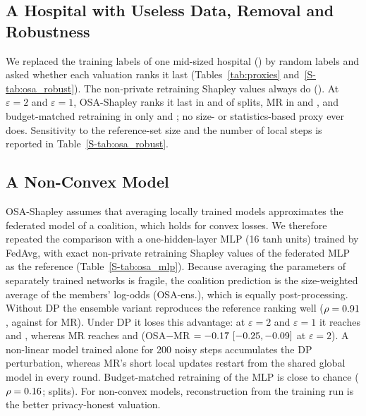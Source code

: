 \subsection{A Hospital with Useless Data, Removal and Robustness}
\label{sec:p19_robust}
We replaced the training labels of one mid-sized hospital (\corrHosp) by random labels and asked whether each valuation ranks it last (Tables~\ref{tab:proxies} and~\ref{S-tab:osa_robust}). The non-private retraining Shapley values always do (\corrTruth). At $\varepsilon=2$ and $\varepsilon=1$, OSA-Shapley ranks it last in \corrOsaTwo{} and \corrOsaOne{} of splits, MR in \corrMrTwo{} and \corrMrOne, and budget-matched retraining in only \corrBmTwo{} and \corrBmOne; no size- or statistics-based proxy ever does. Sensitivity to the reference-set size and the number of local steps is reported in Table~\ref{S-tab:osa_robust}.

\subsection{A Non-Convex Model}
\label{sec:p19_mlp}
OSA-Shapley assumes that averaging locally trained models approximates the federated model of a coalition, which holds for convex losses. We therefore repeated the comparison with a one-hidden-layer MLP (16 tanh units) trained by FedAvg, with exact non-private retraining Shapley values of the federated MLP as the reference (Table~\ref{S-tab:osa_mlp}). Because averaging the parameters of separately trained networks is fragile, the coalition prediction is the size-weighted average of the members' log-odds (OSA-ens.), which is equally post-processing. Without DP the ensemble variant reproduces the reference ranking well ($\rho=0.91$, against \mlpMrNoDP{} for MR). Under DP it loses this advantage: at $\varepsilon=2$ and $\varepsilon=1$ it reaches \mlpOsaTwo{} and \mlpOsaOne{}, whereas MR reaches \mlpMrTwo{} and \mlpMrOne{} (OSA$-$MR $=-0.17\ [-0.25, -0.09]$ at $\varepsilon=2$). A non-linear model trained alone for 200 noisy steps accumulates the DP perturbation, whereas MR's short local updates restart from the shared global model in every round. Budget-matched retraining of the MLP is close to chance ($\rho=0.16$; \mlpBmSeeds{} splits). For non-convex models, reconstruction from the training run is the better privacy-honest valuation.


